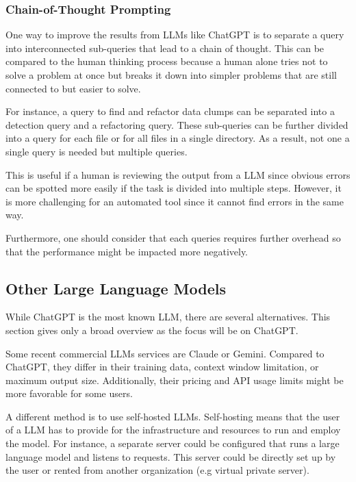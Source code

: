 \subsubsection{Chain-of-Thought Prompting}\label{sec:chain of thought}

One way to improve the results from \acp{LLM} like ChatGPT is to separate a query into interconnected sub-queries that lead to a chain of thought. This can be compared to the human thinking process because a human alone tries not to solve a problem at once but breaks it down into simpler problems that are still connected to but easier to solve. \cite{Wei2022ChainOT}

For instance, a query to find and refactor data clumps can be separated into a detection query and a refactoring query. These sub-queries can be further divided into a query for each file or for all files in a single directory. As a result, not one a single query is needed but multiple queries. 

This is useful if a human is reviewing the output from a \ac{LLM} since obvious errors can be spotted more easily if the task is divided into multiple steps. However, it is more challenging for an automated tool since it cannot find errors in the same way. 

Furthermore, one should consider that each queries requires further overhead so that the performance might be impacted more negatively. 




\subsection{Other Large Language Models}

While ChatGPT is the most known \ac{LLM}, there are several alternatives. This section gives only a broad overview as the focus will be on ChatGPT.

Some recent commercial \acp{LLM} services are Claude or Gemini. Compared to ChatGPT, they differ in their training data, context window limitation, or maximum output size. Additionally, their pricing and API usage limits might be more favorable for some users.

A different method  is to use self-hosted \acp{LLM}.
Self-hosting means that the user of a \ac{LLM} has to provide for the infrastructure and resources to run and employ the model. For instance, a separate server could be configured that runs a large language model and listens to requests. This server could be directly set up by the user or rented from another organization (e.g virtual private server). 

